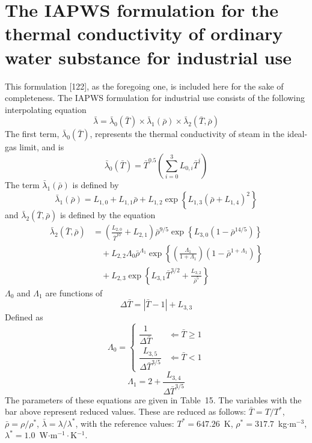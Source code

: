 \documentclass[11pt]{article}
\begin{document}
\section{The IAPWS formulation for the thermal conductivity of ordinary water substance
for industrial use}

This formulation [122], as the foregoing one, is included here for the sake of
completeness. The IAPWS formulation for industrial use consists of the following
interpolating equation
\begin{equation}
\bar{\lambda} = \bar{\lambda}_0(\bar{T}) \times \bar{\lambda}_1(\bar{\rho}) \times
\bar{\lambda}_2(\bar{T}, \bar{\rho})
\end{equation}
The first term, $\bar{\lambda}_0(\bar{T})$, represents the thermal conductivity of steam
in the ideal-gas limit, and is
\begin{equation}
\bar{\lambda}_0(\bar{T}) = \bar{T}^{0.5} \left(\sum_{i=0}^{3} L_{0,i} \bar{T}^i\right)
\end{equation}
The term $\bar{\lambda}_1(\bar{\rho})$ is defined by
\begin{equation}
\bar{\lambda}_1(\bar{\rho}) = L_{1,0} + L_{1,1}\bar{\rho} + L_{1,2}
\exp\left\{L_{1,3}(\bar{\rho} + L_{1,4})^2\right\}
\end{equation}
and $\bar{\lambda}_2(\bar{T}, \bar{\rho})$ is defined by the equation
\begin{equation}
\begin{aligned}
\bar{\lambda}_2(\bar{T}, \bar{\rho}) &= \left(\frac{L_{2,0}}{\bar{T}^{10}} +
L_{2,1}\right) \bar{\rho}^{9/5} \exp\left\{L_{3,0}\left(1 - \bar{\rho}^{14/5}\right)\right\}\\
&\quad + L_{2,2} \Lambda_0 \bar{\rho}^{\Lambda_1} \exp\left\{\left(\frac{\Lambda_1}
{1+\Lambda_1}\right)\left(1 - \bar{\rho}^{1+\Lambda_1}\right)\right\}\\
&\quad + L_{2,3} \exp\left\{L_{3,1} \bar{T}^{3/2} + \frac{L_{3,2}}{\bar{\rho}^5}\right\}
\end{aligned}
\end{equation}
$\Lambda_0$ and $\Lambda_1$ are functions of
\begin{equation}
\Delta \bar{T} = |\bar{T} - 1| + L_{3,3}
\end{equation}
Defined as
\begin{equation}
\Lambda_0 =
\begin{cases}
\dfrac{1}{\Delta \bar{T}} & \Longleftarrow \bar{T} \ge 1 \\[2mm]
\dfrac{L_{3,5}}{\Delta \bar{T}^{3/5}} & \Longleftarrow \bar{T} < 1
\end{cases}
\end{equation}
\begin{equation}
\Lambda_1 = 2 + \frac{L_{3,4}}{\Delta \bar{T}^{3/5}}
\end{equation}
The parameters of these equations are given in Table~15. The variables with the bar above
represent reduced values. These are reduced as follows: $\bar{T} = T/T^*$,
$\bar{\rho} = \rho/\rho^*$, $\bar{\lambda} = \lambda/\lambda^*$, with the reference values:
$T^* = 647.26$~K, $\rho^* = 317.7$~kg$\cdot$m$^{-3}$, $\lambda^* = 1.0$~W$\cdot$m$^{-1}
\cdot$K$^{-1}$.
\end{document}
